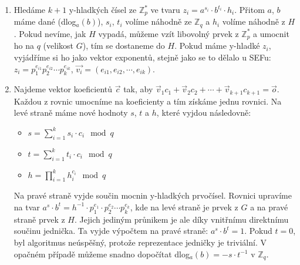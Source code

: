 \begin{enumerate}
\item Hledáme $k+1$ y-hladkých čísel ze $\mathbb{Z}_p^*$ ve tvaru $z_i =
a^{s_i}\cdot b^{t_i}\cdot h_i$. Přitom $a$, $b$ máme dané (dlog$_a(b)$), $s_i$,
$t_i$ volíme náhodně ze  $\mathbb{Z}_q$ a $h_i$ volíme náhodně z $H$. Pokud
nevíme, jak $H$ vypadá, můžeme vzít libovolný prvek z  $\mathbb{Z}_p^*$ a
umocnit ho na $q$ (velikost $G$), tím se dostaneme do $H$. Pokud máme y-hladké $z_i$, vyjádříme
si ho jako vektor exponentů, stejně jako se to dělalo u SEFu: $z_i =
p_1^{e_{i1}}p_2^{e_{i2}}\cdots p_k^{e_{ik}}$, $\vec{v_i} = (e_{i1}, e_{i2},
\cdots, e_{ik})$.
\item Najdeme vektor koeficientů $\vec{c}$ tak, aby $\vec{v}_1c_1 + \vec{v}_2c_2
+ \cdots + \vec{v}_{k+1}c_{k+1} = \vec{o}$. Každou z rovnic umocníme na
koeficienty a tím získáme jednu rovnici. Na levé straně máme nové hodnoty $s$,
$t$ a $h$, které vyjdou následovně:
\begin{itemize}
\item $s = \sum_{i=1}^k s_i \cdot c_i \mod q$
\item $t = \sum_{i=1}^k t_i \cdot c_i \mod q$
\item $h = \prod_{i=1}^k h_i^{c_i} \mod q$
\end{itemize}
Na pravé straně vyjde součin mocnin y-hladkých prvočísel. Rovnici upravíme na
tvar $a^s\cdot b^t = h^{-1}\cdot p_1^{e_1}\cdot p_2^{e_2}\cdots p_k^{e_k}$, kde
na levé straně je prvek z $G$ a na pravé straně prvek z $H$. Jejich jediným
průnikem je ale díky vnitřnímu direktnímu součinu jednička. Ta vyjde výpočtem na
pravé straně: $a^s\cdot b^t = 1$. Pokud $t=0$, byl algoritmus neúspěšný, protože
reprezentace jedničky je triviální. V opačném případě můžeme snadno dopočítat
dlog$_a(b) = -s \cdot t^{-1}$ v $\mathbb{Z}_q$.
\end{enumerate}

